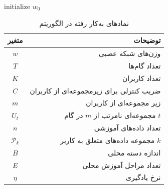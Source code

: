 \begin{LTR}
\begin{algorithm}[t]
	\begin{RTL}
		\caption{%
میانگین‌گیری فدرال
			\cite{mcmahan2017communication}
		}
		\label{algo_FedAvg}
	\end{RTL}
	
	\begin{latin}
		initialize $w_0$\;
	\end{latin}
\end{algorithm}
\end{LTR}


\begin{table}[h]
	\centering
	\caption{نمادهای به‌کار رفته در الگوریتم
	}
	\label{tabel_FedAvgNotations}
	\begin{tabular}{cr}
		\hline
		متغیر & توضیحات \\
		\hline
		$w$ & وزن‌های شبکه عصبی \\
		$T$ & تعداد گام‌ها \\
		$K$ & تعداد کاربران \\
		$C$ & ضریب کنترلی برای زیرمجموعه‌ای از کاربران \\
		$m$ & زیر مجموعه‌ای از کاربران \\
		$U_t$ & مجموعه‌ای نامرتب از $m$ در گام $t$ \\
		$n$ & تعداد داده‌های آموزشی \\
		$\mathcal{P}_k$ & مجموعه داده‌های متعلق به کاربر $k$ \\
		$B$ & اندازه دسته محلی \\
		$E$ & تعداد مراحل آموزش محلی \\
		$\eta$ & نرخ یادگیری
	\end{tabular}
\end{table}


